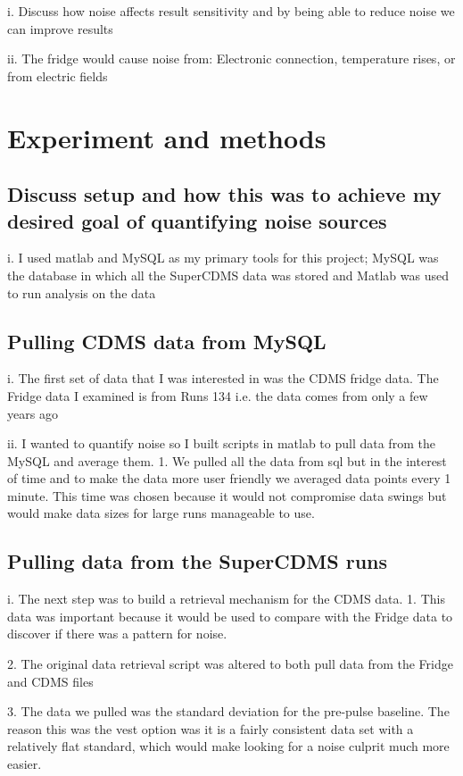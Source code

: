 i.	Discuss how noise affects result sensitivity and by being able to reduce noise we can improve results 

ii.	The fridge would cause noise from: Electronic connection, temperature rises, or from electric fields

\section{Experiment and methods} 

\subsection{Discuss setup and how this was to achieve my desired goal of quantifying noise sources}
i.	I used matlab and MySQL as my primary tools for this project; MySQL was the database in which all the SuperCDMS data was stored and Matlab was used to run analysis on the data

\subsection{Pulling CDMS data from MySQL}
i.	The first set of data that I was interested in was the CDMS fridge data. The Fridge data I examined is from Runs 134 i.e. the data comes from only a few years ago

ii.	I wanted to quantify noise so I built scripts in matlab to pull data from the MySQL and average them.
1.	We pulled all the data from sql but in the interest of time and to make the data more user friendly we averaged data points every 1 minute. This time was chosen because it would not compromise data swings but would make data sizes for large runs manageable to use. 

\subsection{Pulling data from the SuperCDMS runs}
i.	The next step was to build a retrieval mechanism for the CDMS data. 
1.	This data was important because it would be used to compare with the Fridge data to discover if there was a pattern for noise.

2.	The original data retrieval script was altered to both pull data from the Fridge and CDMS files

3.	The data we pulled was the standard deviation for the pre-pulse baseline. The reason this was the vest option was it is a fairly consistent data set with a relatively flat standard, which would make looking for a noise culprit much more easier. 


